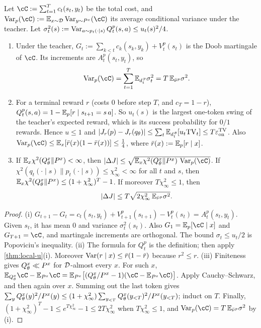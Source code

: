 \begin{proposition}\label{prop:valmart}
\Pv\Ck Let $\cC:=\sum_{t=1}^Tc_t(s_t,y_t)$ be the total cost, and $\Var_p(\cC):=\E_{x\sim\cD}\Var_{y\sim\Pseq}(\cC)$ its average
conditional variance under the teacher. Let $\sigma_t^2(s):=\operatorname{Var}_{a\sim p_t(\cdot\mid s)}Q^p_t(s,a)\le u_t(s)^2/4$.
\begin{enumerate}[label=(\roman*),nosep]
\item Under the teacher, $G_t:=\sum_{k<t}c_k(s_k,y_k)+V^p_t(s_t)$ is the Doob martingale of $\cC$. Its increments are
$A^p_t(s_t,y_t)$, so
\[
\Var_p(\cC)=\sum_{t=1}^T\E_{\dteach t}\sigma_t^2=T\,\E_{\bar\nu^p}\sigma^2 .
\]
\item For a terminal reward $r$ (costs $0$ before step $T$, and $c_T=1-r$), $Q^p_t(s,a)=1-\mathbb{E}_p[r\mid s_{t+1}=s\,a]$. So $u_t(s)$
is the largest one-token swing of the teacher's expected reward, which is its success probability for
$0/1$ rewards. Hence $u\le1$ and $|J_r(p)-J_r(q_\theta)|\le\sum_t\mathbb{E}_{d^{\,\theta}_{t}}[u_t\mathrm{TV}_t]\le T\varepsilon_{\mathrm{on}}^{\mathrm{TV}}$. Also
$\Var_p(\cC)\le\E_x[\bar r(x)(1-\bar r(x))]\le\frac14$, where $\bar r(x):=\mathbb{E}_p[r\mid x]$.
\item If $\mathbb{E}_x\chi^2(Q^{x}_{\theta}\|P^{x})<\infty$, then $|\Delta J|\le\sqrt{\E_x\chi^2(\Qseq\|\Pseq)\,\Var_p(\cC)}$. If
$\chi^2(q_t(\cdot\mid s)\|p_t(\cdot\mid s))\le\chi^2_\infty<\infty$ for all $t$ and $s$, then $\mathbb{E}_x\chi^2(Q^{x}_{\theta}\|P^{x})\le(1+\chi^2_\infty)^T-1$. If
moreover $T\chi^2_\infty\le1$, then
\[
|\Delta J|\le T\sqrt{2\chi^2_\infty\,\mathbb{E}_{\bar\nu^p}\sigma^2}.
\]
\end{enumerate}
\end{proposition}
\begin{proof}
(i) $G_{t+1}-G_t=c_t(s_t,y_t)+V^p_{t+1}(s_{t+1})-V^p_t(s_t)=A^p_t(s_t,y_t)$. Given $s_t$, it has mean $0$ and variance
$\sigma_t^2(s_t)$. Also $G_1=\E_p[\cC\mid x]$ and $G_{T+1}=\cC$, and martingale increments are orthogonal. The bound
$\sigma_t\le u_t/2$ is Popoviciu's inequality.
(ii) The formula for $Q^p_t$ is the definition; then apply \cref{thm:local-u}(i). Moreover
$\operatorname{Var}(r\mid x)\le\bar r(1-\bar r)$ because $r^2\le r$.
(iii) Finiteness gives $Q^{x}_{\theta}\ll P^{x}$ for $\mathcal{D}$-almost every $x$. For such $x$,
$\E_{\Qseq}\cC-\E_{\Pseq}\cC=\E_{\Pseq}\big[(\Qseq/\Pseq-1)(\cC-\E_{\Pseq}\cC)\big]$. Apply Cauchy--Schwarz, and then again over $x$.
Summing out the last token gives $\sum_yQ^{x}_{\theta}(y)^2/P^{x}(y)\le(1+\chi^2_\infty)\sum_{y_{<T}}Q^{x}_{\theta}(y_{<T})^2/P^{x}(y_{<T})$; induct on $T$.
Finally, $(1+\chi^2_\infty)^T-1\le e^{T\chi^2_\infty}-1\le2T\chi^2_\infty$ when $T\chi^2_\infty\le1$, and $\Var_p(\cC)=T\,\E_{\bar\nu^p}\sigma^2$ by (i).
\end{proof}

